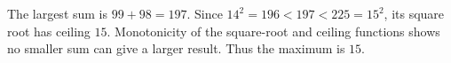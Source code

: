 The largest sum is $99+98=197$. Since $14^2=196<197<225=15^2$, its square root has ceiling $15$. Monotonicity of the square-root and ceiling functions shows no smaller sum can give a larger result. Thus the maximum is $\boxed{15}$.
